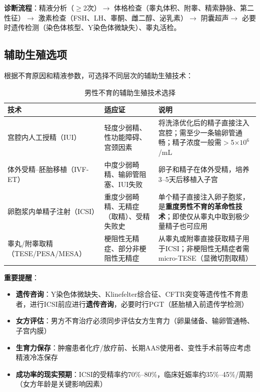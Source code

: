\textbf{诊断流程}：精液分析（$\ge$2次）$\rightarrow$ 体格检查（睾丸体积、附睾、精索静脉、第二性征）$\rightarrow$ 激素检查（FSH、LH、睾酮、雌二醇、泌乳素）$\rightarrow$ 阴囊超声$\rightarrow$ 必要时遗传检测（染色体核型、Y染色体微缺失）、睾丸活检。

\subsection{辅助生殖选项}

根据不育原因和精液参数，可选择不同层次的辅助生殖技术：

\begin{table}[htbp]
\centering
\caption{男性不育的辅助生殖技术选择}
\label{tab:art_options}
\begin{tabularx}{\textwidth}{@{}lXX@{}}
    \toprule
    \textbf{技术} & \textbf{适应证} & \textbf{说明} \\
    \midrule
    宫腔内人工授精（IUI） & 轻度少弱精、性功能障碍、宫颈因素 & 将洗涤优化后的精子直接注入宫腔；需至少一条输卵管通畅；精子浓度一般需$>$5$\times10^6$/mL \\
    \midrule
    体外受精--胚胎移植（IVF-ET） & 中度少弱畸精、输卵管阻塞、IUI失败 & 卵子和精子在体外受精，培养3--5天后移植入子宫 \\
    \midrule
    卵胞浆内单精子注射（ICSI） & 重度少弱畸精、无精症（取精）、受精失败史 & 单个精子直接注入卵子胞浆，是\textbf{重度男性不育的革命性技术}；即使仅从睾丸中取到极少量精子也可应用 \\
    \midrule
    睾丸/附睾取精（TESE/PESA/MESA） & 梗阻性无精症、部分非梗阻性无精症 & 从睾丸或附睾直接获取精子用于ICSI；非梗阻性无精症者需micro-TESE（显微切割取精） \\
    \bottomrule
\end{tabularx}
\end{table}

\textbf{重要提醒}：
\begin{itemize}[leftmargin=2cm]
	\item \textbf{遗传咨询}：Y染色体微缺失、Klinefelter综合征、CFTR突变等遗传性不育患者，进行ICSI前应进行\textbf{遗传咨询}，必要时行PGT（胚胎植入前遗传学检测）
	\item \textbf{女方评估}：男方不育治疗必须同步评估女方生育力（卵巢储备、输卵管通畅、子宫内膜）
	\item \textbf{生育力保存}：肿瘤患者化疗/放疗前、长期AAS使用者、变性手术前等应考虑精液冷冻保存
	\item \textbf{成功率的现实预期}：ICSI的受精率约70\%--80\%，临床妊娠率约35\%--45\%/周期（女方年龄是关键影响因素）
\end{itemize}

